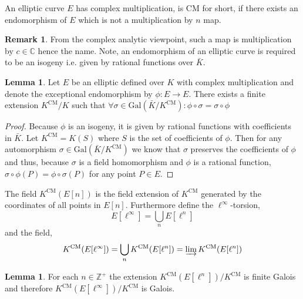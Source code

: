 \documentclass{article}
\newcommand{\Gal}[1]{\mathrm{Gal}\left( #1 \right)}
\newcommand{\Z}{\mathbb{Z}}
\newcommand{\C}{\mathbb{C}}
\theoremstyle{definition}
\newtheorem{lemma}[theorem]{Lemma}
\newtheorem{remark}{Remark}[section]
\newenvironment{definition}[1][Definition:]{\begin{trivlist}
\item[\hskip \labelsep {\bfseries #1}]}{\end{trivlist}}
\begin{document}
\begin{definition}
An elliptic curve $E$ has complex multiplication, is CM for short, if there exists an endomorphism of $E$ which is not a multiplication by $n$ map. 
\end{definition}

\begin{remark}
From the complex analytic viewpoint, such a map is multiplication by $c \in \C$ hence the name. Note, an endomorphism of an elliptic curve is required to be an isogeny i.e. given by rational functions over $\bar{K}$. 
\end{remark}

\newcommand{\CM}{\mathrm{CM}}

\begin{lemma}
Let $E$ be an elliptic defined over $K$ with complex multiplication and denote the exceptional endomorphism by $\phi : E \to E$. There exists a finite extension $K^{\CM} / K$ such that $\forall \sigma \in \Gal{\bar{K} / K^{\CM}} : \phi \circ \sigma = \sigma \circ \phi$   
\end{lemma}

\begin{proof}
Because $\phi$ is an isogeny, it is given by rational functions with coefficients in $\bar{K}$. Let $K^{\CM} = K(S)$ where $S$ is the set of coefficients of $\phi$. Then for any automorphism $\sigma \in \Gal{\bar{K} / K^{\CM}}$ we know that $\sigma$ preserves the coefficients of $\phi$ and thus, because $\sigma$ is a field homomorphism and $\phi$ is a rational function, $\sigma \circ \phi(P) = \phi \circ \sigma(P)$ for any point $P \in E$.  
\end{proof}

\begin{definition}
The field $K^{\CM}(E[n])$ is the field extension of $K^{\CM}$ generated by the coordinates of all points in $E[n]$. Furthermore define the $\ell^\infty$-torsion,
\[ E[\ell^\infty] = \bigcup_{n} E[\ell^n] \]
and the field,
\[ K^{\CM}(E[\ell^\infty]) = \bigcup_{n} K^{\CM} (E[\ell^n]) = \varinjlim K^{\CM}(E[\ell^n]) \]
\end{definition}

\begin{lemma}
For each $n \in \Z^{+}$ the extension $K^{\CM} (E[\ell^n]) / K^{\CM}$ is finite Galois and therefore $K^{\CM} (E[\ell^\infty]) / K^{\CM}$ is Galois.
\end{lemma}
\end{document}
